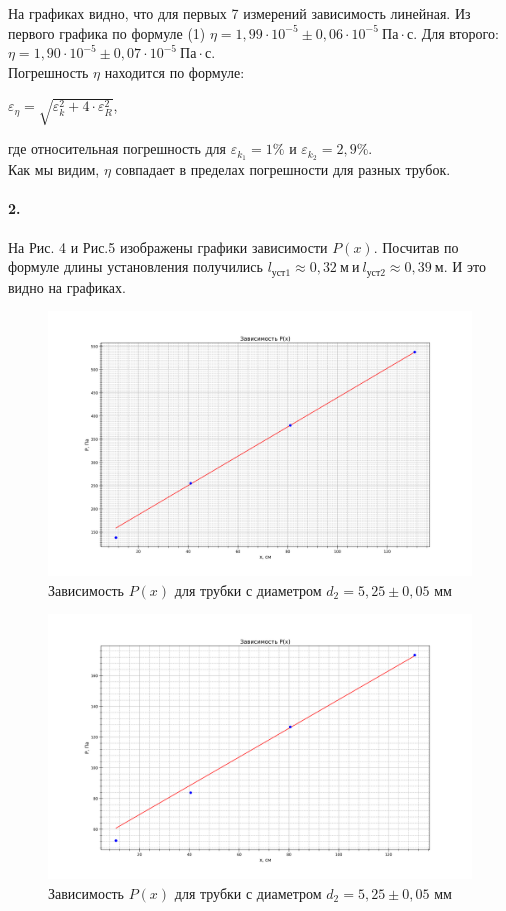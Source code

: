 \documentclass[a4paper,12pt]{article}
\begin{document}
На графиках видно, что для первых 7 измерений зависимость линейная. Из первого графика по формуле (1) $\eta = 1,99\cdot 10^{-5}\pm 0,06\cdot 10^{-5} ~Па \cdot с$. Для второго: $\eta=1,90\cdot 10^{-5}\pm 0,07\cdot 10^{-5}~ Па \cdot с$.\\
Погрешность $\eta$ находится по формуле:
\begin{center}
    $\varepsilon_{\eta}=\sqrt{\varepsilon_{k}^2 + 4\cdot \varepsilon_{R}^2}$,
\end{center}
где относительная погрешность для $\varepsilon_{k_1}=1\%$ и $\varepsilon_{k_2}=2,9\%$.\\
Как мы видим, $\eta$ совпадает в пределах погрешности для разных трубок.
\paragraph{2.} На Рис. 4 и Рис.5 изображены графики зависимости $P(x)$. Посчитав по формуле длины установления получились $l_{уст1}\approx 0,32~ м ~ и ~ l_{уст2}\approx 0,39~ м$. И это видно на графиках.
\begin{figure}[!h]
\centering
\includegraphics[width=1\linewidth]{P(x)1.png}
\caption{Зависимость $P(x)$ для трубки с диаметром $d_2=5,25\pm 0,05$ мм}
\label{fig:mpr}
\end{figure}
\begin{figure}[!h]
\centering
\includegraphics[width=1\linewidth]{P(x)2.png}
\caption{Зависимость $P(x)$ для трубки с диаметром $d_2=5,25\pm 0,05$ мм}
\label{fig:mpr}
\end{figure}
\end{document}
